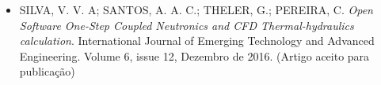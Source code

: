 \documentclass[12pt,openright,twoside,a4paper,english,french,spanish,brazil]{abntex2}
\begin{document}
\begin{anexosenv}
\begin{itemize}
\item SILVA, V. V. A; SANTOS, A. A. C.; THELER, G.; PEREIRA, C. \textit{Open Software One-Step Coupled Neutronics and CFD Thermal-hydraulics calculation}. International Journal of Emerging Technology and Advanced Engineering. Volume 6, issue 12, Dezembro de 2016. (Artigo aceito para publicação)
  


%


%

%

%

\end{itemize}

\end{anexosenv}


\printindex
\end{document}
